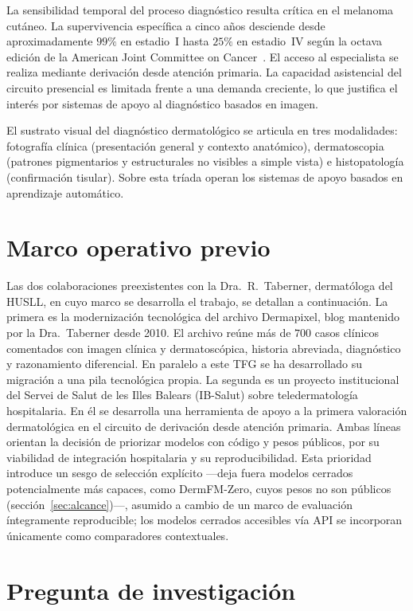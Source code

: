 La sensibilidad temporal del proceso diagnóstico resulta crítica en
el melanoma cutáneo. La supervivencia específica a cinco años
desciende desde aproximadamente $99\%$ en estadio~I hasta
$25\%$ en estadio~IV según la octava edición de la American
Joint Committee on Cancer~\cite{ajcc8}. El acceso al especialista
se realiza mediante derivación desde atención primaria. La
capacidad asistencial del circuito presencial es limitada frente a
una demanda creciente, lo que justifica el interés por sistemas de
apoyo al diagnóstico basados en imagen.

El sustrato visual del diagnóstico dermatológico se articula en tres
modalidades: fotografía clínica (presentación general y contexto
anatómico), dermatoscopia (patrones pigmentarios y estructurales no
visibles a simple vista) e histopatología (confirmación
tisular). Sobre esta tríada operan los sistemas de apoyo basados en
aprendizaje automático.


\section{Marco operativo previo}
\label{sec:trabajo-previo}

Las dos colaboraciones preexistentes con la Dra.~R.~Taberner,
dermatóloga del HUSLL, en cuyo marco se desarrolla el trabajo, se
detallan a continuación. La primera es la modernización tecnológica
del archivo Dermapixel,
blog mantenido por la Dra.~Taberner desde 2010. El archivo reúne
más de $700$ casos clínicos comentados con imagen clínica y
dermatoscópica, historia abreviada, diagnóstico y razonamiento
diferencial. En paralelo a este TFG se ha desarrollado su migración
a una pila tecnológica propia. La segunda es un proyecto
institucional del Servei de Salut de les Illes Balears (IB-Salut)
sobre teledermatología hospitalaria. En él se desarrolla una
herramienta de apoyo a la primera valoración dermatológica en el
circuito de derivación desde atención primaria. Ambas líneas
orientan la decisión de priorizar modelos con código y pesos
públicos, por su viabilidad de integración hospitalaria y su
reproducibilidad. Esta prioridad introduce un sesgo de selección
explícito ---deja fuera modelos cerrados potencialmente más capaces,
como DermFM-Zero, cuyos pesos no son públicos
(sección~\ref{sec:alcance})---, asumido a cambio de un marco de
evaluación íntegramente reproducible; los modelos cerrados accesibles
vía API se incorporan únicamente como comparadores contextuales.


\section{Pregunta de investigación}
\label{sec:pregunta}

